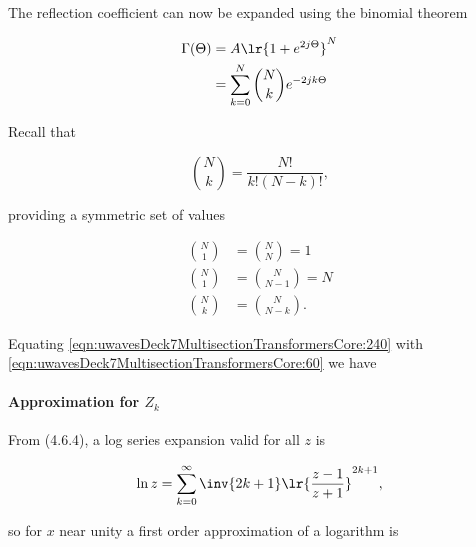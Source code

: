 The reflection coefficient can now be expanded using the binomial theorem

\begin{equation}\label{eqn:uwavesDeck7MultisectionTransformersCore:240}
\begin{aligned}
\Gamma(\Theta)
&= A \lr{ 1 + e^{ 2 j \Theta } }^N
\\ &= \sum_{k = 0}^N \binom{N}{k} e^{ -2 j k \Theta}
\end{aligned}
\end{equation}

Recall that

\begin{equation}\label{eqn:uwavesDeck7MultisectionTransformersCore:260}
\binom{N}{k} = \frac{N!}{k! (N-k)!},
\end{equation}

providing a symmetric set of values

\begin{equation}\label{eqn:uwavesDeck7MultisectionTransformersCore:280}
\begin{aligned}
\binom{N}{1} &= \binom{N}{N} = 1 \\
\binom{N}{1} &= \binom{N}{N-1} = N \\
\binom{N}{k} &= \binom{N}{N-k}.
\end{aligned}
\end{equation}

Equating \cref{eqn:uwavesDeck7MultisectionTransformersCore:240} with \cref{eqn:uwavesDeck7MultisectionTransformersCore:60} we have


\paragraph{Approximation for \( Z_k \)}

From \citep{NIST:DLMF} (4.6.4), a log series expansion valid for all \( z \) is

\begin{equation}\label{eqn:uwavesDeck7MultisectionTransformersCore:320}
\ln z = \sum_{k = 0}^\infty \inv{2 k + 1} \lr{ \frac{ z - 1 }{z + 1} }^{2k + 1},
\end{equation}

so for \( x \) near unity a first order approximation of a logarithm is

